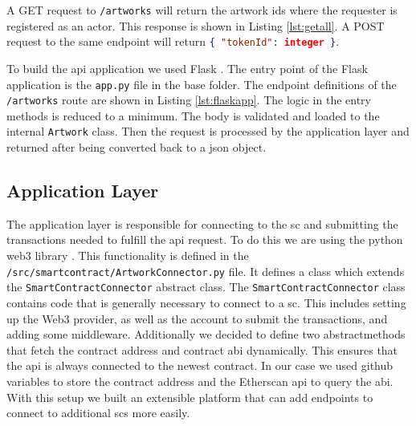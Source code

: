 

A GET request to \texttt{/artworks} will return the artwork ids where the requester is registered as an actor. This response is shown in Listing \ref{lst:getall}. A POST request to the same endpoint will return \lstinline[language=JSON]!{ "tokenId": integer }!.



To build the \gls{api} application we used Flask \cite{flask}. The entry point of the Flask application is the \texttt{app.py} file in the base folder. The endpoint definitions of the \texttt{/artworks} route are shown in Listing \ref{lst:flaskapp}. The logic in the entry methods is reduced to a minimum. The body is validated and loaded to the internal \texttt{Artwork} class. Then the request is processed by the application layer and returned after being converted back to a \gls{json} object.




\subsection{Application Layer}
The application layer is responsible for connecting to the \gls{sc} and submitting the transactions needed to fulfill the \gls{api} request. To do this we are using the python web3 library \cite{web3python}. This functionality is defined in the \texttt{/src/smartcontract/ArtworkConnector.py} file. It defines a class which extends the \texttt{SmartContractConnector} abstract class. The \texttt{SmartContractConnector} class contains code that is generally necessary to connect to a \gls{sc}. This includes setting up the Web3 provider, as well as the account to submit the transactions, and adding some middleware. Additionally we decided to define two abstractmethods that fetch the contract address and contract \gls{abi} dynamically. This ensures that the \gls{api} is always connected to the newest contract. In our case we used github variables to store the contract address and the Etherscan \cite{etherscan} \gls{api} to query the \gls{abi}. With this setup we built an extensible platform that can add endpoints to connect to additional \glspl{sc} more easily. 

